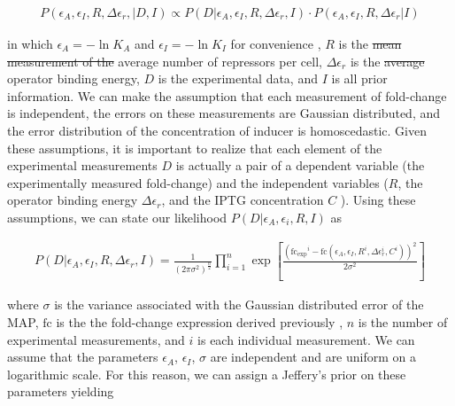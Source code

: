 \begin{align}
P(\epsilon_A, \epsilon_I, R, \Delta\epsilon_r, \vert D, I) \propto P(D \vert
\epsilon_A, \epsilon_I, R, \Delta\epsilon_r, I)\cdot P(\epsilon_A, \epsilon_I,
R, \Delta\epsilon_r \vert I)
\end{align}

in  which $\epsilon_A = -\ln K_A$ and
$\epsilon_I = -\ln K_I$ for convenience , $R$ is the \sout{mean measurement of the} average number of
repressors per cell, $\Delta\epsilon_r$ is the \sout{average} operator binding energy, $D$ is the experimental data, and $I$ is all prior
information. We can make the assumption that each measurement of fold-change
is independent, the errors on these measurements are Gaussian distributed, and
the error distribution of the concentration of inducer is homoscedastic. Given
these assumptions, it is important to realize that each element of the
experimental measurements $D$ is actually a pair of a dependent variable (the
experimentally measured fold-change) and the independent variables ($R$, the
operator binding energy $\Delta\epsilon_r$, and the IPTG concentration $C$ ). Using these assumptions, we can state our likelihood $P(D \vert \epsilon_A, \epsilon_i, R, I)$ as

\begin{align}
P(D \vert \epsilon_A, \epsilon_I, R, \Delta\epsilon_r, I) =
\frac{1}{(2\pi\sigma^2)^{\frac{n}{2}}}\prod\limits_{i=1}^n\exp\left[\frac{(\mathrm{fc_{exp}}^i -
\mathrm{fc}(\epsilon_A, \epsilon_I, R^i, \Delta\epsilon_r^i,
C^i))^2}{2\sigma^2}\right]
\end{align}

where  $\sigma$ is the variance associated with the Gaussian distributed error
of the MAP, $\mathrm{fc}$ is the the fold-change expression  derived previously
, $n$ is the number of experimental measurements, and $i$ is each
individual measurement. We can assume that the parameters $\epsilon_A$,
$\epsilon_I$, $\sigma$ are independent and are uniform on a logarithmic scale.
For this reason, we can assign a Jeffery's prior on these parameters yielding


